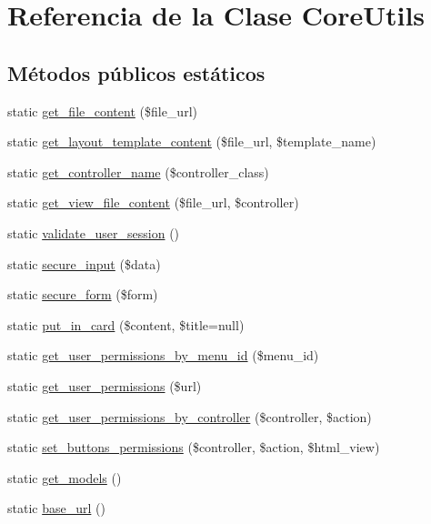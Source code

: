 \hypertarget{class_core_utils}{}\section{Referencia de la Clase Core\+Utils}
\label{class_core_utils}
\subsection*{Métodos públicos estáticos}
\begin{DoxyCompactItemize}
\item 
static \mbox{\hyperlink{class_core_utils_a53e64d1ce4c4369cdc8bf4176ebce031}{get\+\_\+file\+\_\+content}} (\$file\+\_\+url)
\item 
static \mbox{\hyperlink{class_core_utils_a490278ea7bf81aedced314965479a4b1}{get\+\_\+layout\+\_\+template\+\_\+content}} (\$file\+\_\+url, \$template\+\_\+name)
\item 
static \mbox{\hyperlink{class_core_utils_ada9d6950d7ad8d0199d823939b727479}{get\+\_\+controller\+\_\+name}} (\$controller\+\_\+class)
\item 
static \mbox{\hyperlink{class_core_utils_a6de0f13d487f0d6d55183343925bfba0}{get\+\_\+view\+\_\+file\+\_\+content}} (\$file\+\_\+url, \$controller)
\item 
static \mbox{\hyperlink{class_core_utils_a701b4e73787e301fd7dc0d5a94f114ba}{validate\+\_\+user\+\_\+session}} ()
\item 
static \mbox{\hyperlink{class_core_utils_a712603fe257899a1fb36127c08ae6c3f}{secure\+\_\+input}} (\$data)
\item 
static \mbox{\hyperlink{class_core_utils_a0a55e05c60ee707245f0ee9605e5fa5c}{secure\+\_\+form}} (\$form)
\item 
static \mbox{\hyperlink{class_core_utils_a925c7e1c369c0d8421b32f4e7d09e2e6}{put\+\_\+in\+\_\+card}} (\$content, \$title=null)
\item 
static \mbox{\hyperlink{class_core_utils_ad0a0f31bcfb13e8e2e9c95a501e6dfc9}{get\+\_\+user\+\_\+permissions\+\_\+by\+\_\+menu\+\_\+id}} (\$menu\+\_\+id)
\item 
static \mbox{\hyperlink{class_core_utils_ae5603ae99ba9ffe573bca46e834e3c23}{get\+\_\+user\+\_\+permissions}} (\$url)
\item 
static \mbox{\hyperlink{class_core_utils_a10d5b2d56fd4d1109e8de78c5facaa7c}{get\+\_\+user\+\_\+permissions\+\_\+by\+\_\+controller}} (\$controller, \$action)
\item 
static \mbox{\hyperlink{class_core_utils_ac7ddc4fe9d11f5922beb99a21e01d716}{set\+\_\+buttons\+\_\+permissions}} (\$controller, \$action, \$html\+\_\+view)
\item 
static \mbox{\hyperlink{class_core_utils_a10ac6261e9a04457430db1f22d2321f9}{get\+\_\+models}} ()
\item 
static \mbox{\hyperlink{class_core_utils_adcf62251d03ae5b1095544507fb63375}{base\+\_\+url}} ()
\end{DoxyCompactItemize}


